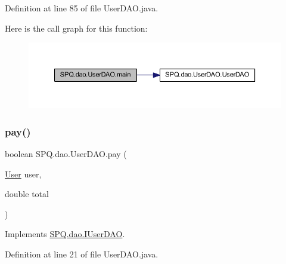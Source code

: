 Definition at line 85 of file User\+D\+A\+O.\+java.

Here is the call graph for this function\+:\nopagebreak
\begin{figure}[H]
\begin{center}
\leavevmode
\includegraphics[width=350pt]{class_s_p_q_1_1dao_1_1_user_d_a_o_a8f6efdd35a56fedb08c9c9c62586c36b_cgraph}
\end{center}
\end{figure}
\mbox{\label{class_s_p_q_1_1dao_1_1_user_d_a_o_a8223c677b1ae55147860ea533be434a7}} 
\subsubsection{\texorpdfstring{pay()}{pay()}}
{\footnotesize\ttfamily boolean S\+P\+Q.\+dao.\+User\+D\+A\+O.\+pay (\begin{DoxyParamCaption}\item[{\mbox{\hyperlink{class_s_p_q_1_1data_1_1_user}{User}}}]{user,  }\item[{double}]{total }\end{DoxyParamCaption})}



Implements \mbox{\hyperlink{interface_s_p_q_1_1dao_1_1_i_user_d_a_o_a8a4257a186a80d5842e26aeb1140a402}{S\+P\+Q.\+dao.\+I\+User\+D\+AO}}.



Definition at line 21 of file User\+D\+A\+O.\+java.

